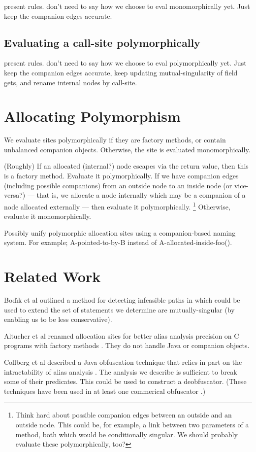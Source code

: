 \documentclass[11pt,notitlepage]{article}
\begin{document}
present rules.  don't need to say how we choose to eval
monomorphically yet.  Just keep the companion edges accurate.

\subsection{Evaluating a call-site polymorphically}

present rules.  don't need to say how we choose to eval
polymorphically yet.  Just keep the companion edges accurate,
keep updating mutual-singularity of field gets,
and rename internal nodes by call-site.

\section{Allocating Polymorphism}

We evaluate sites polymorphically if they are factory methods, or
contain unbalanced companion objects.  Otherwise, the site is
evaluated monomorphically.

(Roughly) If an allocated (internal?) node escapes via the return
value, then this is a factory method.  Evaluate it polymorphically.
If we have companion edges (including possible companions) from
an outside node to an inside node (or vice-versa?) --- that is, we
allocate a node internally which may be a companion of a node allocated
externally --- then evaluate it polymorphically.%
\footnote{Think hard about possible companion edges between an
outside and an outside node.  This could be, for example, a
link between two parameters of a method, both which would be
conditionally singular.  We should probably evaluate these
polymorphically, too?}
Otherwise, evaluate it monomorphically.

Possibly unify polymorphic allocation sites using a companion-based
naming system.  For example; A-pointed-to-by-B instead of
A-allocated-inside-foo().

\section{Related Work}

Bod{\'\i}k et al outlined a method for detecting infeasible paths
in \cite{267921} which could be used to extend the set of statements
we determine are mutually-singular (by enabling us to be less conservative).

Altucher et al renamed allocation sites for better alias analysis
precision on C programs with factory methods \cite{199466}.  They
do not handle Java or companion objects.

Collberg et al described a Java obfuscation technique that relies in
part on the intractability of alias analysis \cite{268962}.  The
analysis we describe is sufficient to break some of their predicates.
This could be used to construct a deobfuscator.  (These techniques
have been used in at least one commerical obfuscator \cite{humper02}.)



\end{document}
